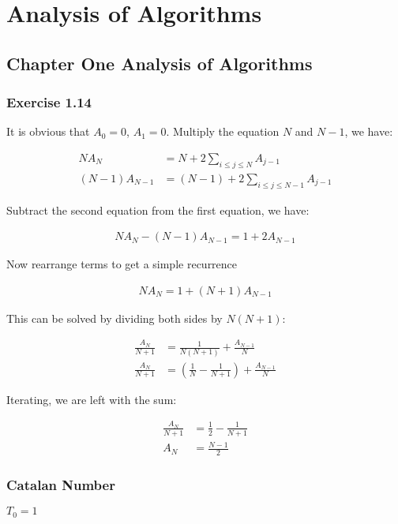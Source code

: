 \documentclass{book}
\begin{document}
\part{Analysis of Algorithms}
\chapter{Chapter One Analysis of Algorithms}
\section*{Exercise 1.14}

It is obvious that $A_{0} = 0$, $A_{1} = 0$. Multiply the equation $N$ and $N-1$, we
have:

\begin{align*}
  NA_{N} &= N + 2 \sum_{i \leq j \leq N} A_{j-1} \\
  (N-1)A_{N-1} &= (N-1) + 2 \sum_{i \leq j \leq N-1} A_{j-1}
\end{align*}

Subtract the second equation from the first equation, we have:

\begin{align*}
NA_{N} - (N-1)A_{N-1} = 1 + 2 A_{N-1}
\end{align*}

Now rearrange terms to get a simple recurrence

\begin{align*}
  NA_{N} = 1 + (N+1)A_{N-1}
\end{align*}

This can be solved by dividing both sides by $N(N+1)$:

\begin{align*}
  \frac{A_{N}}{N+1} &= \frac{1}{N(N+1)} + \frac{A_{N-1}}{N} \\
  \frac{A_{N}}{N+1} &= (\frac{1}{N} - \frac{1}{N+1}) + \frac{A_{N-1}}{N}
\end{align*}

Iterating, we are left with the sum:

\begin{align*}
  \frac{A_{N}}{N+1} &= \frac{1}{2} - \frac{1}{N+1} \\
  A_{N} &= \frac{N-1}{2}
\end{align*}


\section*{Catalan Number}
$T_{0} = 1$
\end{document}
